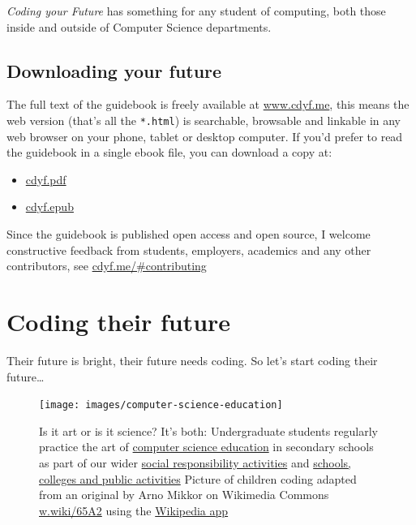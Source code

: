 \documentclass[
  12pt,
]{book}
\providecommand{\tightlist}{%
  \setlength{\itemsep}{0pt}\setlength{\parskip}{0pt}}
\begin{document}
\emph{Coding your Future} has something for any student of computing, both those inside and outside of Computer Science departments. 👨🏿‍💻👨‍💻👩🏽‍💻👩‍💻👩🏿‍💻

\hypertarget{downloading}{%
\section{Downloading your future}\label{downloading}}

The full text of the guidebook is freely available at \href{https://www.cdyf.me/}{www.cdyf.me}, this means the web version (that's all the \texttt{*.html}) is searchable, browsable and linkable in any web browser on your phone, tablet or desktop computer. If you'd prefer to read the guidebook in a single ebook file, you can download a copy at:

\begin{itemize}
\tightlist
\item
  \href{https://www.cdyf.me/cdyf.pdf}{cdyf.pdf}
\item
  \href{https://www.cdyf.me/cdyf.epub}{cdyf.epub}
\end{itemize}

Since the guidebook is published open access and open source, I welcome constructive feedback from students, employers, academics and any other contributors, see \href{https://www.cdyf.me/\#contributing}{cdyf.me/\#contributing}

\hypertarget{coding-their-future}{%
\chapter{Coding their future}\label{coding-their-future}}

Their future is bright, their future needs coding. So let's start coding their future\ldots{}



\begin{figure}

{\centering \texttt{[image: images/computer-science-education]} 

}

\caption{Is it art or is it science? It's both: Undergraduate students regularly practice the art of \href{https://en.wikipedia.org/wiki/Computer_science_education}{computer science education} in secondary schools as part of our wider \href{https://www.cs.manchester.ac.uk/connect/social-responsibility/}{social responsibility activities} \citep{m2020, m20202} and \href{https://www.cs.manchester.ac.uk/connect/schools-colleges-public/}{schools, colleges and public activities} Picture of children coding adapted from an original by Arno Mikkor on Wikimedia Commons \href{https://w.wiki/65A2}{w.wiki/65A2} using the \href{https://apps.apple.com/us/app/wikipedia/id324715238}{Wikipedia app}}\label{fig:unnamed-chunk-6}
\end{figure}
\end{document}
